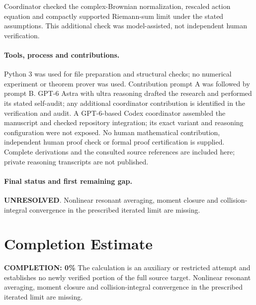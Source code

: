 \documentclass[11pt]{article}
\begin{document}
Coordinator checked the complex-Brownian normalization, rescaled action equation and compactly supported Riemann-sum limit under the stated assumptions. This additional check was model-assisted, not independent human verification.

\paragraph{Tools, process and contributions.}
Python 3 was used for file preparation and structural checks; no numerical experiment or theorem prover was used. Contribution prompt A was followed by prompt B. GPT-6 Astra with ultra reasoning drafted the research and performed its stated self-audit; any additional coordinator contribution is identified in the verification and audit. A GPT-6-based Codex coordinator assembled the manuscript and checked repository integration; its exact variant and reasoning configuration were not exposed. No human mathematical contribution, independent human proof check or formal proof certification is supplied. Complete derivations and the consulted source references are included here; private reasoning transcripts are not published.

\paragraph{Final status and first remaining gap.}
\textbf{UNRESOLVED}. Nonlinear resonant averaging, moment closure and collision-integral convergence in the prescribed iterated limit are missing.

\section{Completion Estimate}
\noindent\textbf{COMPLETION: 0\%}
The calculation is an auxiliary or restricted attempt and establishes no newly verified portion of the full source target. Nonlinear resonant averaging, moment closure and collision-integral convergence in the prescribed iterated limit are missing.
\end{document}
